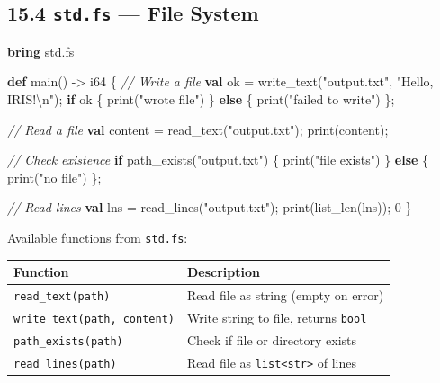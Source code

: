 \documentclass[
  english,
]{book}
\newenvironment{Shaded}{\begin{snugshade}}{\end{snugshade}}
\newcommand{\CommentTok}[1]{\textcolor[rgb]{0.42,0.60,0.33}{\textit{#1}}}
\newcommand{\ControlFlowTok}[1]{\textcolor[rgb]{0.77,0.53,0.75}{\textbf{#1}}}
\newcommand{\DataTypeTok}[1]{\textcolor[rgb]{0.31,0.79,0.69}{#1}}
\newcommand{\DecValTok}[1]{\textcolor[rgb]{0.71,0.81,0.66}{#1}}
\newcommand{\FunctionTok}[1]{\textcolor[rgb]{0.86,0.86,0.67}{#1}}
\newcommand{\KeywordTok}[1]{\textcolor[rgb]{0.34,0.61,0.84}{\textbf{#1}}}
\newcommand{\NormalTok}[1]{\textcolor[rgb]{0.83,0.83,0.83}{#1}}
\newcommand{\OperatorTok}[1]{\textcolor[rgb]{0.83,0.83,0.83}{#1}}
\newcommand{\StringTok}[1]{\textcolor[rgb]{0.81,0.57,0.47}{#1}}
\begin{document}
\subsection{\texorpdfstring{15.4 \texttt{std.fs} --- File
System}{15.4 std.fs --- File System}}\label{std.fs-file-system}

\begin{Shaded}
\begin{Highlighting}[]
\KeywordTok{bring}\NormalTok{ std}\OperatorTok{.}\NormalTok{fs}

\KeywordTok{def}\NormalTok{ main() }\OperatorTok{{-}\textgreater{}} \DataTypeTok{i64}\NormalTok{ \{}
    \CommentTok{// Write a file}
    \KeywordTok{val} \FunctionTok{ok} \OperatorTok{=}\NormalTok{ write\_text(}\StringTok{"output.txt"}\NormalTok{, }\StringTok{"Hello, IRIS!\textbackslash{}n"}\NormalTok{);}
    \ControlFlowTok{if} \FunctionTok{ok}\NormalTok{ \{}
        \FunctionTok{print}\NormalTok{(}\StringTok{"wrote file"}\NormalTok{)}
\NormalTok{    \} }\ControlFlowTok{else}\NormalTok{ \{}
        \FunctionTok{print}\NormalTok{(}\StringTok{"failed to write"}\NormalTok{)}
\NormalTok{    \};}

    \CommentTok{// Read a file}
    \KeywordTok{val}\NormalTok{ content }\OperatorTok{=}\NormalTok{ read\_text(}\StringTok{"output.txt"}\NormalTok{);}
    \FunctionTok{print}\NormalTok{(content);}

    \CommentTok{// Check existence}
    \ControlFlowTok{if}\NormalTok{ path\_exists(}\StringTok{"output.txt"}\NormalTok{) \{}
        \FunctionTok{print}\NormalTok{(}\StringTok{"file exists"}\NormalTok{)}
\NormalTok{    \} }\ControlFlowTok{else}\NormalTok{ \{}
        \FunctionTok{print}\NormalTok{(}\StringTok{"no file"}\NormalTok{)}
\NormalTok{    \};}

    \CommentTok{// Read lines}
    \KeywordTok{val}\NormalTok{ lns }\OperatorTok{=}\NormalTok{ read\_lines(}\StringTok{"output.txt"}\NormalTok{);}
    \FunctionTok{print}\NormalTok{(}\FunctionTok{list\_len}\NormalTok{(lns));}
    \DecValTok{0}
\NormalTok{\}}
\end{Highlighting}
\end{Shaded}

Available functions from \texttt{std.fs}:

\begin{longtable}[]{@{}ll@{}}
\toprule\noalign{}
Function & Description \\
\midrule\noalign{}
\endhead
\bottomrule\noalign{}
\endlastfoot
\texttt{read\_text(path)} & Read file as string (empty on error) \\
\texttt{write\_text(path,\ content)} & Write string to file, returns
\texttt{bool} \\
\texttt{path\_exists(path)} & Check if file or directory exists \\
\texttt{read\_lines(path)} & Read file as
\texttt{list\textless{}str\textgreater{}} of lines \\
\end{longtable}
\end{document}
